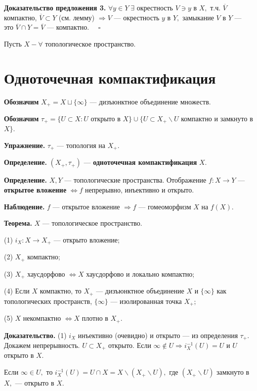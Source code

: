 \documentclass[12pt,a4paper]{article}
\begin{document}
\textbf{Доказательство предложения 3.} $\forall y \in Y \; \exists$ окрестность $V \ni y$ в $X,$ т.ч. $\overline{V}$ компактно, $\overline{V} \subset Y$ (см. лемму) $\Rightarrow V$ --- окрестность $y$ в $Y,$ замыкание $V$ в $Y$ --- это $\overline{V} \cap Y = \overline{V}$ --- компактно. $\quad \square$ 

Пусть $X - \forall$ топологическое пространство.

\section{Одноточечная компактификация}

\textbf{Обозначим} $X_{+} = X \sqcup \{\infty\}$ --- дизъюнктное объединение множеств. 

\textbf{Обозначим} $\tau_{+} = \{U \subset X\!: U$ открыто в $X\} \cup \{U \subset X_{+} \backslash U$ компактно и замкнуто в $X\}.$

\textbf{Упражнение.} $\tau_{+}$ --- топология на $X_{+}.$

\textbf{Определение.} $(X_{+}, \tau_{+})$ --- \textbf{одноточечная компактификация} $X.$

\textbf{Определение.} $X, Y$ --- топологические пространства. Отображение $f\!: X \to Y$ --- \textbf{открытое вложение} $\Leftrightarrow f$ непрерывно, инъективно и открыто. 

\textbf{Наблюдение.} $f$ --- открытое вложение $\Rightarrow f$ --- гомеоморфизм $X$ на $f(X).$

\textbf{Теорема.} $X$ --- топологическое пространство. 

(1) $i_{X}\!: X \to X_{+}$ --- открыто вложение;

(2) $X_{+}$ компактно;

(3) $X_{+}$ хаусдорфово $\Leftrightarrow X$ хаусдорфово и локально компактно;

(4) Если $X$ компактно, то $X_{+}$ --- дизъюнктное объединение $X$ и $\{\infty\}$ как топологических пространств, $\{\infty\}$ --- изолированная точка $X_{+};$

(5) $X$ некомпактно $\Leftrightarrow X$ плотно в $X_{+}.$

\textbf{Доказательство.} (1) $i_{X}$ инъективно (очевидно) и открыто --- из определения $\tau_{+}.$ Докажем непрерывность. $U \subset X_{+}$ открыто. Если $\infty \not \in U \Rightarrow i_{X}^{-1}(U) = U$ и $U$ открыто в $X.$

Если $\infty \in U,$ то $i_{X}^{-1}(U) = U \cap X = X \backslash (X_{+} \backslash U),$ где $(X_{+} \backslash U)$ замкнуто в $X,$ --- открыто в $X.$
\end{document}
